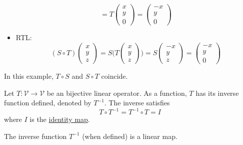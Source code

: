 \begin{exm}
\begin{itemize}
\begin{equation*}
			      =T\begin{pmatrix}
				      x \\ y \\ 0
			      \end{pmatrix}
			      =\begin{pmatrix}
				      -x \\ y \\ 0
			      \end{pmatrix}
		      \end{equation*}
		\item RTL:
		      \begin{equation*}
			      (S \circ T)\begin{pmatrix}
				      x \\ y \\ z
			      \end{pmatrix}=S\Bigg(T\begin{pmatrix}
				      x \\ y \\ z
			      \end{pmatrix}\Bigg)
			      =S\begin{pmatrix}
				      -x \\ y \\ z
			      \end{pmatrix}
			      =\begin{pmatrix}
				      -x \\ y \\ 0
			      \end{pmatrix}
		      \end{equation*}
	\end{itemize}
	In this example, $T \circ S$ and $S \circ T$ coincide.
\end{exm}

\begin{definition}\label{def-inverse-map}
	Let $T:\mathcal{V}\to\mathcal{V}$ be an bijective linear operator. As a function,
	$T$ has its inverse function defined, denoted by $T^{-1}$. The inverse satisfies
	\begin{equation}
		T \circ T^{-1} = T^{-1} \circ T = I
	\end{equation}
	where $I$ is the \hyperref[exm-identity-map]{identity map}.
\end{definition}

\begin{thm}\label{thm-linear-inverse-map}
	The inverse function $T^{-1}$ (when defined) is a linear map.
\end{thm}

